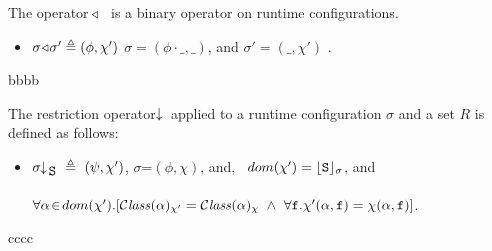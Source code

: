  

 \begin{definition}  The operator $\!\triangleleft\!$\ \  is a binary operator on runtime configurations.
 \label{def:config:adapt}
 $~ $ 
 
\begin{itemize}
\item
$\sigma \!\triangleleft\! \sigma' \triangleq (\phi,\chi')$  \IFF $\sigma=(\phi\cdot\_,\_)$, and $\sigma'= (\_,\chi')$ .
\end{itemize}

\end{definition}

bbbb

 \begin{definition}  The restriction operator $\!\!\downarrow\!_{} $ applied to a runtime configuration $\sigma$ and a set $R$ is defined as follows:   
 \label{def:config:restrct}
 $~ $ 
 
\begin{itemize}
\item
$\restrct {\sigma}{\prg{S}} \ \triangleq \ (\psi, \chi')$, \IFF  $\sigma$=$(\phi,\chi)$,  and, \  $dom(\chi')={\lfloor{ {{\mbox{\tt{S}}}}}\rfloor_{\sigma}}$, and  \\
$\ \strut \ \ \hspace{1.2in} $  
 $\forall \alpha\!\in\!dom(\chi').[ {\mathcal C}{\mathit{lass}}(\alpha)_{\chi'} =  {\mathcal C}{\mathit{lass}}(\alpha)_{\chi}\ \wedge \ \forall {\mbox{\tt{f}}}.  \chi'(\alpha,{\mbox{\tt{f}}})=\chi(\alpha,{\mbox{\tt{f}}})]$.
\end{itemize}
\end{definition} 

cccc

